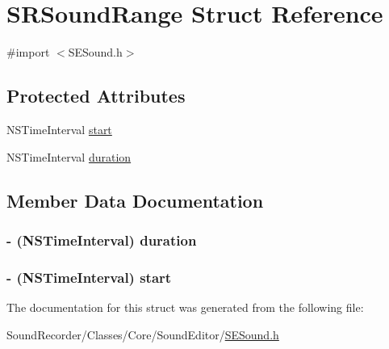 \hypertarget{struct_s_r_sound_range}{\section{S\-R\-Sound\-Range Struct Reference}
\label{struct_s_r_sound_range}
}


{\ttfamily \#import $<$S\-E\-Sound.\-h$>$}

\subsection*{Protected Attributes}
\begin{DoxyCompactItemize}
\item 
N\-S\-Time\-Interval \hyperlink{struct_s_r_sound_range_abb99eff04c2ddabd3af00a53e98d9201}{start}
\item 
N\-S\-Time\-Interval \hyperlink{struct_s_r_sound_range_a9e12ce90b2eb40ae73f4c24ef1c60768}{duration}
\end{DoxyCompactItemize}


\subsection{Member Data Documentation}
\hypertarget{struct_s_r_sound_range_a9e12ce90b2eb40ae73f4c24ef1c60768}{
\subsubsection[{duration}]{\setlength{\rightskip}{0pt plus 5cm}-\/ (N\-S\-Time\-Interval) duration\hspace{0.3cm}{\ttfamily [protected]}}}\label{struct_s_r_sound_range_a9e12ce90b2eb40ae73f4c24ef1c60768}
\hypertarget{struct_s_r_sound_range_abb99eff04c2ddabd3af00a53e98d9201}{
\subsubsection[{start}]{\setlength{\rightskip}{0pt plus 5cm}-\/ (N\-S\-Time\-Interval) start\hspace{0.3cm}{\ttfamily [protected]}}}\label{struct_s_r_sound_range_abb99eff04c2ddabd3af00a53e98d9201}


The documentation for this struct was generated from the following file\-:\begin{DoxyCompactItemize}
\item 
Sound\-Recorder/\-Classes/\-Core/\-Sound\-Editor/\hyperlink{_s_e_sound_8h}{S\-E\-Sound.\-h}\end{DoxyCompactItemize}
